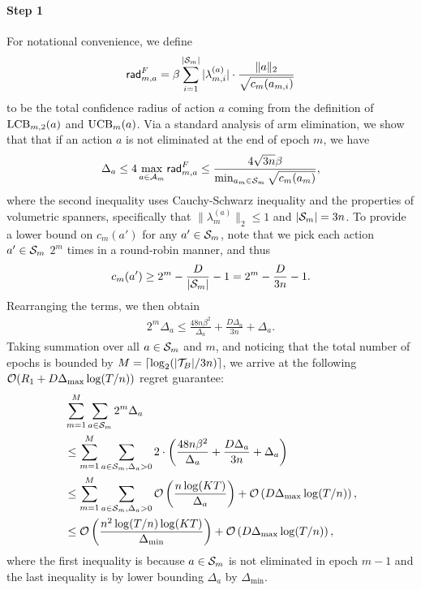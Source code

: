 \paragraph{Step 1}
For notational convenience, we define 
\begin{align*}
    \mathsf{rad}_{m,a}^F=\beta\sum_{i=1}^{|{\mathcal{S}}_m|}|\lambda_{m,i}^{(a)}|\cdot\frac{\|a\|_2}{\sqrt{c_m(a_{m,i})}}
\end{align*}
to be the total confidence radius of action $a$ coming from the definition of ${\operatorname{LCB}}_{m,2}(a)$ and ${\operatorname{UCB}}_m(a)$. 
Via a standard analysis of arm elimination, 
we show that that if an action $a$ is not eliminated at the end of epoch $m$, we have
\begin{align*}
    \Delta_a \leq 4\max_{a\in{\mathcal{A}}_m}\mathsf{rad}_{m,a}^F \leq \frac{4\sqrt{3n}\beta}{\min_{a_m\in{\mathcal{S}}_m}\sqrt{c_m(a_m)}},
\end{align*}
where the second inequality uses Cauchy-Schwarz inequality and the properties of volumetric spanners, specifically that $\|\lambda_{m}^{(a)}\|_2\leq 1$ and $|{\mathcal{S}}_m|=3n$. To provide a lower bound on $c_m(a')$ for any $a'\in{\mathcal{S}}_m$, note that we pick each action $a'\in {\mathcal{S}}_m$ $2^m$ times in a round-robin manner, and thus
\begin{align*}
    c_m(a') \geq 2^m - \frac{D}{|{\mathcal{S}}_m|}-1 = 2^m - \frac{D}{3n}-1.
\end{align*}
Rearranging the terms, we then obtain
\begin{align}\label{eqn:epoch_bound_1}
    2^m\Delta_a \leq \frac{48n\beta^2}{\Delta_a} + \frac{D\Delta_a}{3n} + \Delta_a.
\end{align}
Taking summation over all $a\in{\mathcal{S}}_m$ and $m$, and noticing that the total number of epochs is bounded by $M=\lceil\log_2(|{\mathcal{T}}_B|/3n)\rceil$, we arrive at the following $\mathcal{O}(R_1+D\Delta_{\max}\log(T/n))$ regret guarantee:
\begin{align}
&\sum_{m=1}^{M}\sum_{a\in{\mathcal{S}}_m}2^m\Delta_a \nonumber\\
    &\leq \sum_{m=1}^{M}\sum_{a\in{\mathcal{S}}_m,\Delta_a>0}2\cdot\left(\frac{48n\beta^2}{\Delta_a}+\frac{D\Delta_a}{3n}+\Delta_a\right) \nonumber\\
    &\leq \sum_{m=1}^{M}\sum_{a\in{\mathcal{S}}_m,\Delta_a>0}\mathcal{O}\left(\frac{n\log (KT)}{\Delta_a}\right) + \mathcal{O}\left(D\Delta_{\max}\log(T/n)\right),\nonumber \\
    &\leq \mathcal{O}\left(\frac{n^2\log(T/n)\log (KT)}{\Delta_{\min}}\right) + \mathcal{O}\left(D\Delta_{\max}\log(T/n)\right),\nonumber
\end{align}
where the first inequality is because $a\in{\mathcal{S}}_m$ is not eliminated in epoch $m-1$ and the last inequality is by lower bounding $\Delta_a$ by $\Delta_{\min}$.

